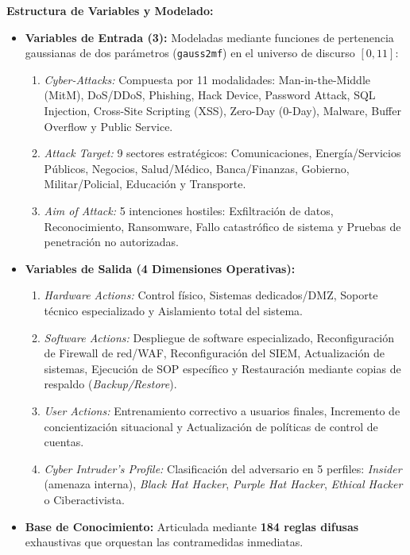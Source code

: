 \documentclass[12pt,a4paper]{article}
\begin{document}
\textbf{Estructura de Variables y Modelado:}
\begin{itemize}
    \item \textbf{Variables de Entrada (3):} Modeladas mediante funciones de pertenencia gaussianas de dos parámetros (\texttt{gauss2mf}) en el universo de discurso $[0, 11]$:
    \begin{enumerate}
        \item \textit{Cyber-Attacks:} Compuesta por 11 modalidades: Man-in-the-Middle (MitM), DoS/DDoS, Phishing, Hack Device, Password Attack, SQL Injection, Cross-Site Scripting (XSS), Zero-Day (0-Day), Malware, Buffer Overflow y Public Service.
        \item \textit{Attack Target:} 9 sectores estratégicos: Comunicaciones, Energía/Servicios Públicos, Negocios, Salud/Médico, Banca/Finanzas, Gobierno, Militar/Policial, Educación y Transporte.
        \item \textit{Aim of Attack:} 5 intenciones hostiles: Exfiltración de datos, Reconocimiento, Ransomware, Fallo catastrófico de sistema y Pruebas de penetración no autorizadas.
    \end{enumerate}
    \item \textbf{Variables de Salida (4 Dimensiones Operativas):}
    \begin{enumerate}
        \item \textit{Hardware Actions:} Control físico, Sistemas dedicados/DMZ, Soporte técnico especializado y Aislamiento total del sistema.
        \item \textit{Software Actions:} Despliegue de software especializado, Reconfiguración de Firewall de red/WAF, Reconfiguración del SIEM, Actualización de sistemas, Ejecución de SOP específico y Restauración mediante copias de respaldo (\textit{Backup/Restore}).
        \item \textit{User Actions:} Entrenamiento correctivo a usuarios finales, Incremento de concientización situacional y Actualización de políticas de control de cuentas.
        \item \textit{Cyber Intruder's Profile:} Clasificación del adversario en 5 perfiles: \textit{Insider} (amenaza interna), \textit{Black Hat Hacker}, \textit{Purple Hat Hacker}, \textit{Ethical Hacker} o Ciberactivista.
    \end{enumerate}
    \item \textbf{Base de Conocimiento:} Articulada mediante \textbf{184 reglas difusas} exhaustivas que orquestan las contramedidas inmediatas.
\end{itemize}
\end{document}
